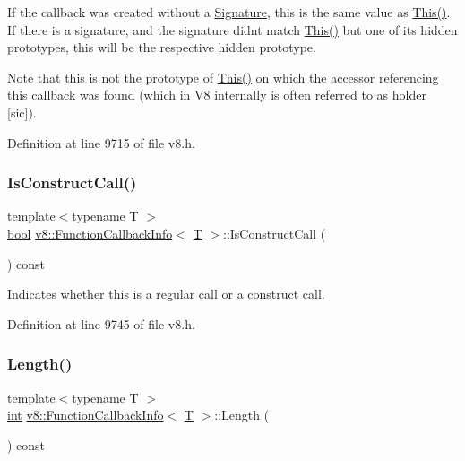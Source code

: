 If the callback was created without a \mbox{\hyperlink{classv8_1_1Signature}{Signature}}, this is the same value as \mbox{\hyperlink{classv8_1_1FunctionCallbackInfo_a4ddfd6d21732dff1c4c55d5441a8a5ca}{This()}}. If there is a signature, and the signature didn\textquotesingle{}t match \mbox{\hyperlink{classv8_1_1FunctionCallbackInfo_a4ddfd6d21732dff1c4c55d5441a8a5ca}{This()}} but one of its hidden prototypes, this will be the respective hidden prototype.

Note that this is not the prototype of \mbox{\hyperlink{classv8_1_1FunctionCallbackInfo_a4ddfd6d21732dff1c4c55d5441a8a5ca}{This()}} on which the accessor referencing this callback was found (which in V8 internally is often referred to as holder \mbox{[}sic\mbox{]}). 

Definition at line 9715 of file v8.\+h.

\mbox{\label{classv8_1_1FunctionCallbackInfo_ad2105b93e9b4d02f42b7338fa5950cbc}} 
\subsubsection{\texorpdfstring{Is\+Construct\+Call()}{IsConstructCall()}}
{\footnotesize\ttfamily template$<$typename T $>$ \\
\mbox{\hyperlink{classbool}{bool}} \mbox{\hyperlink{classv8_1_1FunctionCallbackInfo}{v8\+::\+Function\+Callback\+Info}}$<$ \mbox{\hyperlink{classv8_1_1internal_1_1torque_1_1T}{T}} $>$\+::Is\+Construct\+Call (\begin{DoxyParamCaption}{ }\end{DoxyParamCaption}) const}

Indicates whether this is a regular call or a construct call. 

Definition at line 9745 of file v8.\+h.

\mbox{\label{classv8_1_1FunctionCallbackInfo_af97dd3f1cb01ed039f9479152ad63a84}} 
\subsubsection{\texorpdfstring{Length()}{Length()}}
{\footnotesize\ttfamily template$<$typename T $>$ \\
\mbox{\hyperlink{classint}{int}} \mbox{\hyperlink{classv8_1_1FunctionCallbackInfo}{v8\+::\+Function\+Callback\+Info}}$<$ \mbox{\hyperlink{classv8_1_1internal_1_1torque_1_1T}{T}} $>$\+::Length (\begin{DoxyParamCaption}{ }\end{DoxyParamCaption}) const}

